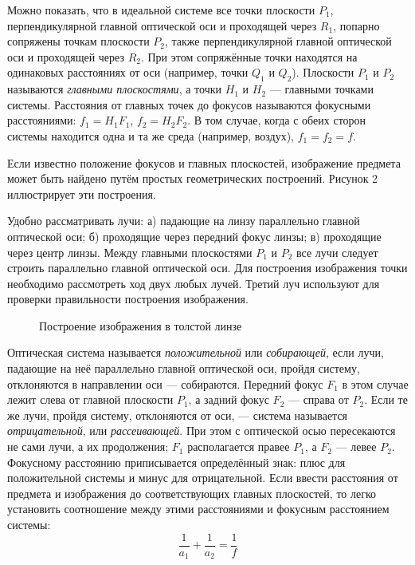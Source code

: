\documentclass[14pt]{article}
\begin{document}
Можно показать, что в идеальной системе все точки плоскости
$P_1$,
перпендикулярной главной оптической оси
и проходящей через
$R_1$, попарно
сопряжены точкам плоскости
$P_2$, также перпендикулярной главной
оптической оси
и проходящей через
$R_2$. При этом сопряжённые точки
находятся на одинаковых расстояниях от оси (например, точки
$Q_1$ и $Q_2$). Плоскости
$P_1$ и
$P_2$ называются \textsl{главными плоскостями}, а точки $H_1$ и
$H_2$ — главными точками системы.
Расстояния от главных точек до фокусов называются фокусными
расстояниями: 
$f_1 = H_1F_1$, $f_2 = H_2F_2$. В том случае,
когда с обеих сторон системы находится одна и
та же среда (например, воздух),
$f_1 = f_2 = f$.


Если известно положение фокусов
и главных плоскостей, изображение
предмета может быть найдено путём простых геометрических построений.
Рисунок 2 иллюстрирует эти построения.


Удобно рассматривать лучи: а) падающие на линзу параллельно главной
оптической оси; б) проходящие через передний фокус линзы; в) проходящие
через центр линзы. Между главными плоскостями $P_1$ и $P_2$ все
лучи следует строить параллельно главной оптической оси. Для построения
изображения точки необходимо рассмотреть
ход двух любых лучей. Третий луч используют для проверки правильности построения изображения.

\begin{figure}[h!]
	\caption{Построение изображения в толстой линзе}
	\label{fig:image}
\end{figure}

Оптическая система называется \textsl{положительной} или \textsl{собирающей},
если лучи, падающие на
неё параллельно главной оптической
оси, пройдя систему, отклоняются в направлении оси
— собираются.
Передний фокус $F_1$ в
этом случае лежит слева от главной
плоскости $P_1$, а задний фокус
$F_2$ — справа от
$P_2$. Если те
же лучи, пройдя систему, отклоняются от оси,
— система называется \textsl{отрицательной}, или \textsl{рассеивающей}. При этом с оптической осью пересекаются не сами лучи,
а их продолжения;
$F_1$ располагается правее $P_1$, а $F_2$ — левее $P_2$. Фокусному расстоянию приписывается определённый
знак: плюс для положительной системы и минус для отрицательной. Если
ввести расстояния от предмета и изображения до соответствующих главных плоскостей, то легко установить соотношение между этими расстояниями
и фокусным расстоянием системы:
\begin{equation}
\frac{1}{a_1} + \frac{1}{a_2} = \frac{1}{f}
\end{equation}
\end{document}
